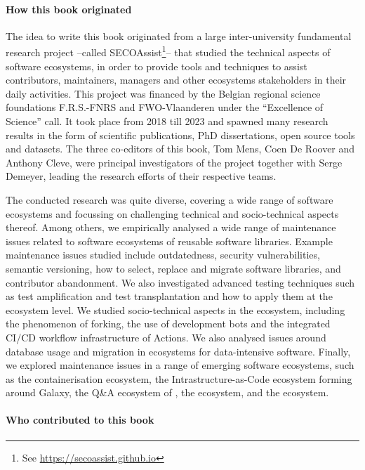 \paragraph{\textbf{How this book originated}}

The idea to write this book originated from a large inter-university fundamental research project --called SECOAssist\footnote{See \url{https://secoassist.github.io}}-- that studied the technical aspects of software ecosystems, in order to provide tools and techniques to assist contributors, maintainers, managers and other ecosystems stakeholders in their daily activities. This project was financed by the Belgian regional science foundations F.R.S.-FNRS and FWO-Vlaanderen under the ``Excellence of Science'' call. It took place from 2018 till 2023 and spawned many research results in the form of scientific publications, PhD dissertations, open source tools and datasets. The three co-editors of this book, Tom Mens, Coen De Roover and Anthony Cleve, were principal investigators of the project together with Serge Demeyer, leading the research efforts of their respective teams.

The conducted research was quite diverse, covering a wide range of software ecosystems and focussing on challenging technical and socio-technical aspects thereof.
Among others, we empirically analysed a wide range of maintenance issues related to software ecosystems of reusable software libraries. %
Example maintenance issues studied include outdatedness, security vulnerabilities, semantic versioning, how to select, replace and migrate software libraries, and contributor abandonment.
We also investigated advanced testing techniques such as test amplification and test transplantation and how to apply them at the ecosystem level.
We studied socio-technical aspects in the \github ecosystem, including the phenomenon of forking, the use of development bots and the integrated CI/CD workflow infrastructure of \github Actions.
We also analysed issues around database usage and migration in ecosystems for data-intensive software.
Finally, we explored maintenance issues in a range of emerging software ecosystems, such as the \dockerhub containerisation ecosystem, the Intrastructure-as-Code ecosystem forming around \ansible Galaxy, the Q\&A ecosystem of \stackoverflow, the \openstack ecosystem, and the \actions ecosystem.

\paragraph{\textbf{Who contributed to this book}}

